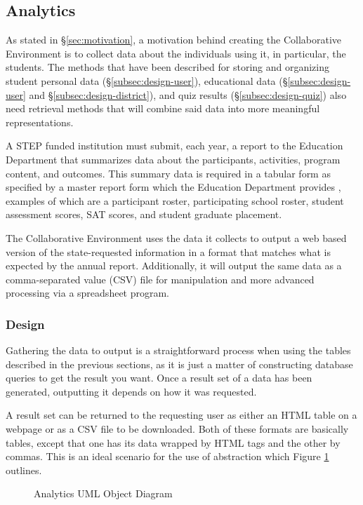 \subsection{Analytics}
\label{subsec:design-analytics}
As stated in \S \ref{sec:motivation}, a motivation behind creating the Collaborative Environment is to collect data about the individuals using it, in particular, the students. The methods that have been described for storing and organizing student personal data (\S \ref{subsec:design-user}), educational data (\S \ref{subsec:design-user} and \S \ref{subsec:design-district}), and quiz results (\S \ref{subsec:design-quiz}) also need retrieval methods that will combine said data into more meaningful representations.

A STEP funded institution must submit, each year, a report to the Education Department that summarizes data about the participants, activities, program content, and outcomes. This summary data is required in a tabular form as specified by a master report form which the Education Department provides \cite{step-final-report}, examples of which are a participant roster, participating school roster, student assessment scores, SAT scores, and student graduate placement.

The Collaborative Environment uses the data it collects to output a web based version of the state-requested information in a format that matches what is expected by the annual report. Additionally, it will output the same data as a comma-separated value (CSV) file for manipulation and more advanced processing via a spreadsheet program.

\subsubsection{Design}
Gathering the data to output is a straightforward process when using the tables described in the previous sections, as it is just a matter of constructing database queries to get the result you want. Once a result set of a data has been generated, outputting it depends on how it was requested.

A result set can be returned to the requesting user as either an HTML table on a webpage or as a CSV file to be downloaded. Both of these formats are basically tables, except that one has its data wrapped by HTML tags and the other by commas. This is an ideal scenario for the use of abstraction which Figure \ref{fig:uml-analytics} outlines.

\begin{figure}[h!]
	\centering
	\caption{Analytics UML Object Diagram}
	\label{fig:uml-analytics}
\end{figure}

